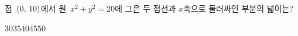 점~$(0,\mkern3mu 10)$에서 원~$x^2+y^2=20$에 그은 두 접선과 $x$축으로 둘러싸인 부분의 넓이는?
\begin{choices32}{$30$}{$35$}{$40$}{$45$}{$50$}\end{choices32}
